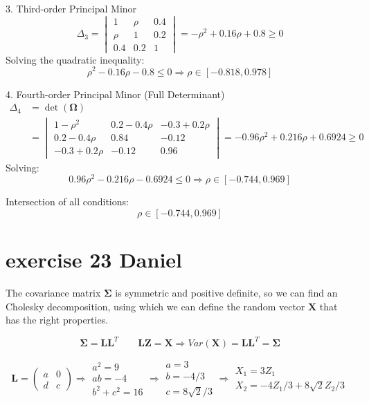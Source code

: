 \documentclass{article}
\let\normalSigma\Sigma
\renewcommand{\Sigma}{\bm{\normalSigma}} %
\begin{document}
3. Third-order Principal Minor
\[
    \Delta_3 = \begin{vmatrix}
        1    & \rho & 0.4 \\
        \rho & 1    & 0.2 \\
        0.4  & 0.2  & 1
    \end{vmatrix}
    = -\rho^2 + 0.16\rho + 0.8 \geq 0
\]
Solving the quadratic inequality:
\[
    \rho^2 - 0.16\rho - 0.8 \leq 0 \Rightarrow \rho \in [-0.818, 0.978]
\]

4. Fourth-order Principal Minor (Full Determinant)
\begin{align*}
    \Delta_4 & = \det(\bm{\Omega})                        \\
             & =\begin{vmatrix}
                    1-\rho^2     & 0.2-0.4\rho & -0.3+0.2\rho \\
                    0.2-0.4\rho  & 0.84        & -0.12        \\
                    -0.3+0.2\rho & -0.12       & 0.96
                \end{vmatrix}
    =-0.96\rho^2 + 0.216\rho + 0.6924 \geq 0
\end{align*}
Solving:
\[
    0.96\rho^2 - 0.216\rho - 0.6924 \leq 0 \Rightarrow \rho \in [-0.744, 0.969]
\]

Intersection of all conditions:
\[
    \rho \in [-0.744, 0.969]
\]

\section{exercise 23 Daniel}
The covariance matrix $\mathbf{\Sigma}$ is symmetric and positive definite,
so we can find an Cholesky decomposition,
using which we can define the random vector $\mathbf{X}$ that has the right properties.

\[{\mathbf{\Sigma }} = {\mathbf{L}}{{\mathbf{L}}^T}\qquad {\mathbf{LZ}} = {\mathbf{X}} \Rightarrow Var\left( {\mathbf{X}} \right) = {\mathbf{L}}{{\mathbf{L}}^T} = {\mathbf{\Sigma }}\]

\[{\mathbf{L}} = \left( {\begin{array}{*{20}{c}}
            a & 0 \\
            d & c
        \end{array}} \right) \Rightarrow \begin{array}{*{20}{c}}
        {{a^2} = 9} \\
        {ab =  - 4} \\
        {{b^2} + {c^2} = 16}
    \end{array} \Rightarrow \begin{array}{*{20}{c}}
        {a = 3}      \\
        {b =  - 4/3} \\
        {c = 8\sqrt 2 /3}
    \end{array} \Rightarrow \begin{array}{*{20}{c}}
        {{X_1} = 3{Z_1}} \\
        {{X_2} =  - 4{Z_1}/3 + 8\sqrt 2 {Z_2}/3}
    \end{array}
\]
\end{document}
